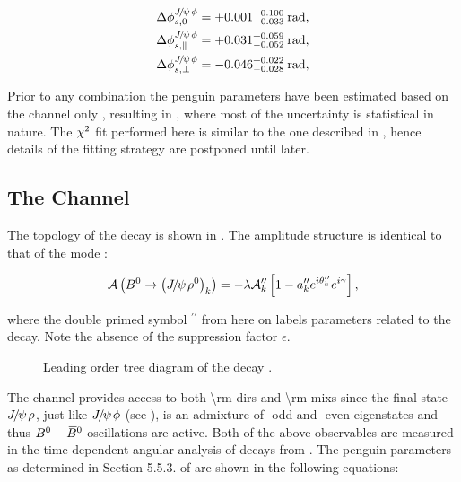 \begin{subequations}
  \label{delta_phis_jpsikst}
  \begin{align}
    \Delta\phi^{{J\mskip -3mu/\mskip -2mu\psi\mskip 2mu}\phi}_{s,{0}}         & = +0.001^{+0.100}_{-0.033} \:\text{rad},\\
    \Delta\phi^{{J\mskip -3mu/\mskip -2mu\psi\mskip 2mu}\phi}_{s,{\parallel}} & = +0.031^{+0.059}_{-0.052} \:\text{rad},\\
    \Delta\phi^{{J\mskip -3mu/\mskip -2mu\psi\mskip 2mu}\phi}_{s,{\perp}}     & = -0.046^{+0.022}_{-0.028} \:\text{rad},
  \end{align}
\end{subequations}

Prior to any combination the penguin parameters have been estimated based on
the \BsJpsiKst channel only \cite{bsjpsikst-paper}, resulting in ,
where most of the uncertainty is statistical in nature. The $\chi^2$ fit performed here is similar
to the one described in , hence details of the fitting strategy are postponed until later.

\subsection{The \BdJpsiRho Channel}
\label{bsjpsirho_chanell}

The topology of the \BdJpsiRho decay is shown in .
The amplitude structure is identical to that of the \BsJpsiKst mode \cite{Fleischer:1999zi}:

\begin{equation}
  \mathcal{A} \left( B^0\rightarrow \left({J\mskip -3mu/\mskip -2mu\psi\mskip 2mu} \rho^0\right)_{k} \right) = -\lambda \mathcal{A}_{k}'' \left[  1 - a_k'' e^{i\theta_k''} e^{i\gamma}  \right],
  \label{bsjpsirho_amp}
\end{equation}

\noindent where the double primed symbol ${}^{\prime\prime}$ from here on labels parameters related to the \BdJpsiRho decay.
Note the absence of the suppression factor $\epsilon$.

\begin{figure}[h]
  \centering
  \scalebox{0.9}{\sffamily }
  \caption{Leading order tree diagram of the decay \BdJpsiRho.}
  \label{bs2jpsirho_diagram}
\end{figure}

The \BdJpsiRho channel provides access to both \Acp{\rm dir} and \Acp{\rm mix} since the final state
${J\mskip -3mu/\mskip -2mu\psi\mskip 2mu}\rho$, just like ${J\mskip -3mu/\mskip -2mu\psi\mskip 2mu}\phi$ (see ), is an admixture of \CP-odd and \CP-even
eigenstates and thus $B^0-\kern 0.18em\overline{\kern -0.18em B}{}^0$ oscillations are active. Both of the above observables are measured
in the time dependent angular analysis of \BdJpsipipi decays from \lhcb \cite{Aaij:2014vda}. The penguin
parameters as determined in Section 5.5.3. of \cite{DeBruyn-thesis} are shown in the following equations:

